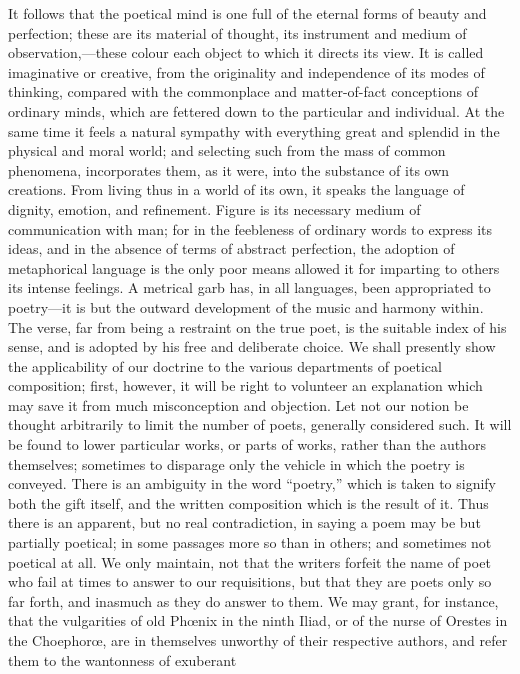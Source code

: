 It follows that the poetical mind is one full of the eternal forms
of beauty and perfection; these are its material of thought, its
instrument and medium of observation,—these colour each object to
which it directs its view. It is called imaginative or creative, from
the originality and independence of its modes of thinking, compared
with the commonplace and matter-of-fact conceptions of ordinary minds,
which are fettered down to the particular and individual. At the same
time it feels a natural sympathy with everything great and splendid in
the physical and moral world; and selecting such from the mass of
common phenomena, incorporates them, as it were, into the substance of
its own creations. From living thus in a world of its own, it speaks
the language of dignity, emotion, and refinement. Figure is its
necessary medium of communication with man; for in the feebleness of
ordinary words to express its ideas, and in the absence of terms of
abstract perfection, the adoption of metaphorical language is the only
poor means allowed it for imparting to others its intense feelings. A
metrical garb has, in all languages, been appropriated to poetry—it
is but the outward development of the music and harmony within. The
verse, far from being a restraint on the true poet, is the suitable
index of his sense, and is adopted by his free and deliberate choice.
We shall presently show the applicability of our doctrine to the
various departments of poetical composition; first, however, it will
be right to volunteer an explanation which may save it from much
misconception and objection. Let not our notion be thought arbitrarily
to limit the number of poets, generally considered such. It will be
found to lower particular works, or parts of works, rather than the
authors themselves; sometimes to disparage only the vehicle in which
the poetry is conveyed. There is an ambiguity in the word
``poetry,'' which is taken to signify both the gift itself,
and the written composition which is the result of it. Thus there is
an apparent, but no real contradiction, in saying a poem may be but
partially poetical; in some passages more so than in others; and
sometimes not poetical at all. We only maintain, not that the writers
forfeit the name of poet who fail at times to answer to our
requisitions, but that they are poets only so far forth, and inasmuch
as they do answer to them. We may grant, for instance, that the
vulgarities of old Phœnix in the ninth Iliad, or of the nurse of
Orestes in the Choephorœ, are in themselves unworthy of their
respective authors, and refer them to the wantonness of exuberant
